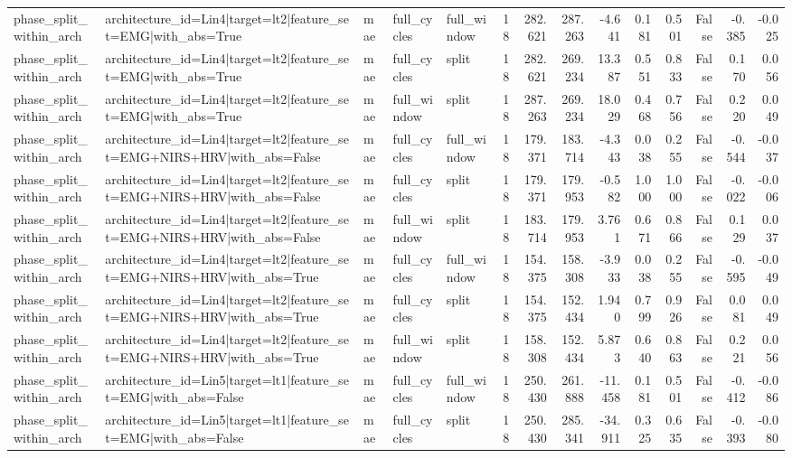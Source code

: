 \begin{table}
\begin{tabular}{lllllrrrrrrrrr}
phase_split_within_arch & architecture_id=Lin4|target=lt2|feature_set=EMG|with_abs=True & mae & full_cycles & full_window & 18 & 282.621 & 287.263 & -4.641 & 0.181 & 0.501 & False & -0.385 & -0.025 \\
phase_split_within_arch & architecture_id=Lin4|target=lt2|feature_set=EMG|with_abs=True & mae & full_cycles & split & 18 & 282.621 & 269.234 & 13.387 & 0.551 & 0.833 & False & 0.170 & 0.056 \\
phase_split_within_arch & architecture_id=Lin4|target=lt2|feature_set=EMG|with_abs=True & mae & full_window & split & 18 & 287.263 & 269.234 & 18.029 & 0.468 & 0.756 & False & 0.220 & 0.049 \\
phase_split_within_arch & architecture_id=Lin4|target=lt2|feature_set=EMG+NIRS+HRV|with_abs=False & mae & full_cycles & full_window & 18 & 179.371 & 183.714 & -4.343 & 0.038 & 0.255 & False & -0.544 & -0.037 \\
phase_split_within_arch & architecture_id=Lin4|target=lt2|feature_set=EMG+NIRS+HRV|with_abs=False & mae & full_cycles & split & 18 & 179.371 & 179.953 & -0.582 & 1.000 & 1.000 & False & -0.022 & -0.006 \\
phase_split_within_arch & architecture_id=Lin4|target=lt2|feature_set=EMG+NIRS+HRV|with_abs=False & mae & full_window & split & 18 & 183.714 & 179.953 & 3.761 & 0.671 & 0.866 & False & 0.129 & 0.037 \\
phase_split_within_arch & architecture_id=Lin4|target=lt2|feature_set=EMG+NIRS+HRV|with_abs=True & mae & full_cycles & full_window & 18 & 154.375 & 158.308 & -3.933 & 0.038 & 0.255 & False & -0.595 & -0.049 \\
phase_split_within_arch & architecture_id=Lin4|target=lt2|feature_set=EMG+NIRS+HRV|with_abs=True & mae & full_cycles & split & 18 & 154.375 & 152.434 & 1.940 & 0.799 & 0.926 & False & 0.081 & 0.049 \\
phase_split_within_arch & architecture_id=Lin4|target=lt2|feature_set=EMG+NIRS+HRV|with_abs=True & mae & full_window & split & 18 & 158.308 & 152.434 & 5.873 & 0.640 & 0.863 & False & 0.221 & 0.056 \\
phase_split_within_arch & architecture_id=Lin5|target=lt1|feature_set=EMG|with_abs=False & mae & full_cycles & full_window & 18 & 250.430 & 261.888 & -11.458 & 0.181 & 0.501 & False & -0.412 & -0.086 \\
phase_split_within_arch & architecture_id=Lin5|target=lt1|feature_set=EMG|with_abs=False & mae & full_cycles & split & 18 & 250.430 & 285.341 & -34.911 & 0.325 & 0.635 & False & -0.393 & -0.080 \\

\end{tabular}
\end{table}
